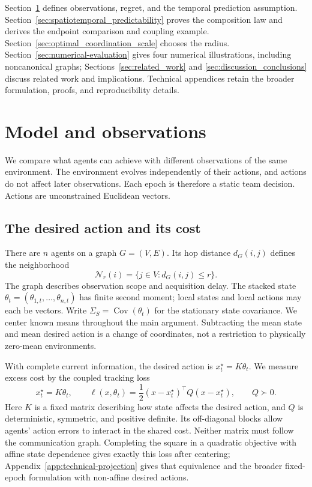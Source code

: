 \documentclass[11pt]{article}
\begin{document}
Section~\ref{sec:model} defines observations, regret, and the temporal
prediction assumption. Section~\ref{sec:spatiotemporal_predictability}
proves the composition law and derives the endpoint comparison and coupling
example. Section~\ref{sec:optimal_coordination_scale} chooses the radius.
Section~\ref{sec:numerical-evaluation} gives four numerical illustrations,
including noncanonical graphs; Sections~\ref{sec:related_work} and
\ref{sec:discussion_conclusions} discuss related work and implications.
Technical appendices retain the broader formulation, proofs, and
reproducibility details.

\section{Model and observations}
\label{sec:model}

We compare what agents can achieve with different observations of the same
environment. The environment evolves independently of their actions, and
actions do not affect later observations. Each epoch is therefore a static
team decision. Actions are unconstrained Euclidean vectors.

\subsection{The desired action and its cost}
\label{subsec:decision_model}

There are $n$ agents on a graph $G=(V,E)$. Its hop distance
$d_G(i,j)$ defines the neighborhood
\begin{equation}
\mathcal N_r(i)=\{j\in V:d_G(i,j)\le r\}.
\label{eq:r_neighborhood}
\end{equation}
The graph describes observation scope and acquisition delay. The stacked
state $\theta_t=(\theta_{1,t},\ldots,\theta_{n,t})$ has finite second
moment; local states and local actions may each be vectors. Write
$\Sigma_S=\operatorname{Cov}(\theta_t)$ for the stationary state covariance.
We center known means throughout the main argument. Subtracting the mean
state and mean desired action is a change of coordinates, not a restriction
to physically zero-mean environments.

With complete current information, the desired action is $x_t^\star=K\theta_t$.
We measure excess cost by the coupled tracking loss
\begin{equation}
x_t^\star=K\theta_t,\qquad
\ell(x,\theta_t)=\frac12(x-x_t^\star)^\top Q(x-x_t^\star),\qquad Q\succ0.
\label{eq:tracking_loss}
\end{equation}
Here $K$ is a fixed matrix describing how state affects the desired action,
and $Q$ is deterministic, symmetric, and positive definite. Its off-diagonal
blocks allow agents' action errors to interact in the shared cost. Neither
matrix must follow the communication graph. Completing the square in a
quadratic objective with affine state dependence gives exactly this loss
after centering; Appendix~\ref{app:technical-projection} gives that equivalence
and the broader fixed-epoch formulation with non-affine desired actions.
\end{document}
